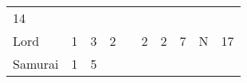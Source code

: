 \documentclass[12pt]{article}
\newcommand{\indexClass}[1]{\index{#1}}
\newcommand{\class}[1]{#1\indexClass{#1}}
\begin{document}
\begin{longtable}[]{@{}llllllllll@{}}
\begin{minipage}[t]{0.08\columnwidth}\raggedright\strut
14
\strut\end{minipage}\tabularnewline
\begin{minipage}[t]{0.13\columnwidth}\raggedright\strut
\class{Lord}
\strut\end{minipage} &
\begin{minipage}[t]{0.06\columnwidth}\raggedright\strut
1
\strut\end{minipage} &
\begin{minipage}[t]{0.06\columnwidth}\raggedright\strut
3
\strut\end{minipage} &
\begin{minipage}[t]{0.06\columnwidth}\raggedright\strut
2
\strut\end{minipage} &
\begin{minipage}[t]{0.06\columnwidth}\raggedright\strut
\strut\end{minipage} &
\begin{minipage}[t]{0.06\columnwidth}\raggedright\strut
2
\strut\end{minipage} &
\begin{minipage}[t]{0.06\columnwidth}\raggedright\strut
2
\strut\end{minipage} &
\begin{minipage}[t]{0.06\columnwidth}\raggedright\strut
7
\strut\end{minipage} &
\begin{minipage}[t]{0.07\columnwidth}\raggedright\strut
N
\strut\end{minipage} &
\begin{minipage}[t]{0.08\columnwidth}\raggedright\strut
17
\strut\end{minipage}\tabularnewline
\begin{minipage}[t]{0.13\columnwidth}\raggedright\strut
\class{Samurai}
\strut\end{minipage} &
\begin{minipage}[t]{0.06\columnwidth}\raggedright\strut
1
\strut\end{minipage} &
\begin{minipage}[t]{0.06\columnwidth}\raggedright\strut
5
\strut\end{minipage} &
\begin{minipage}[t]{0.06\columnwidth}\raggedright\strut
\strut\end{minipage} &
\begin{minipage}[t]{0.06\columnwidth}\raggedright\strut
\strut\end{minipage} &

\end{longtable}
\end{document}

